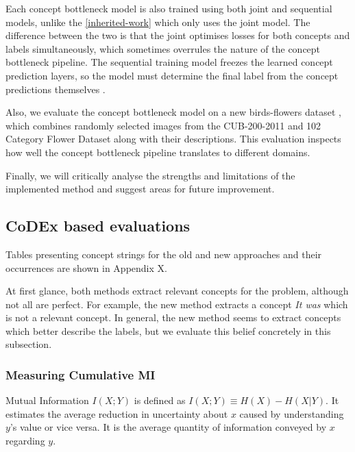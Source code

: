 Each concept bottleneck model is also trained using both joint and sequential models, unlike the \ref{inherited-work} which only uses the joint model.
The difference between the two is that the joint optimises losses for both concepts and labels simultaneously, which sometimes overrules the nature of the concept bottleneck pipeline.
The sequential training model freezes the learned concept prediction layers, so the model must determine the final label from the concept predictions themselves \cite{RefWorks:RefID:68-margeloiu2021concept}.

Also, we evaluate the concept bottleneck model on a new birds-flowers dataset \cite{RefWorks:RefID:69-wah2011caltech-ucsd}, which combines randomly selected images from the CUB-200-2011 and 102 Category Flower Dataset along with their descriptions.
This evaluation inspects how well the concept bottleneck pipeline translates to different domains.

Finally, we will critically analyse the strengths and limitations of the implemented method and suggest areas for future improvement.

\subsection{CoDEx based evaluations}

Tables presenting concept strings for the old and new approaches and their occurrences are shown in Appendix X.

At first glance, both methods extract relevant concepts for the problem, although not all are perfect.
For example, the new method extracts a concept \emph{It was} which is not a relevant concept.
In general, the new method seems to extract concepts which better describe the labels, but we evaluate this belief concretely in this subsection.


\subsubsection{Measuring Cumulative MI}

Mutual Information $I(X;Y)$ \cite{RefWorks:RefID:30-mackay2004information} is defined as $I(X; Y) \equiv H(X) - H(X|Y)$. 
It estimates the average reduction in uncertainty about $x$ caused by understanding $y$'s value or vice versa. 
It is the average quantity of information conveyed by $x$ regarding $y$.

